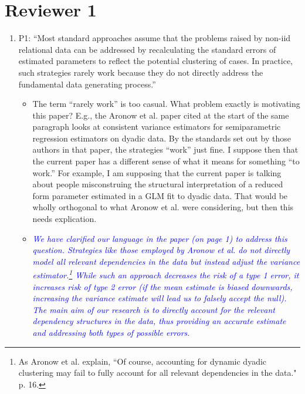 \section*{Reviewer 1}

\begin{enumerate}
	\item P1: ``Most standard approaches assume that the problems raised by non-iid relational data can be addressed by recalculating the standard errors of estimated parameters to reflect the potential clustering of cases. In practice, such strategies rarely work because they do not directly address the fundamental data generating process.''
	\begin{itemize}
		\item The term “rarely work” is too casual.  What problem exactly is motivating this paper?  E.g., the Aronow et al. paper cited at the start of the same paragraph looks at consistent variance estimators for semiparametric regression estimators on dyadic data. By the standards set out by those authors in that paper, the strategies “work” just fine.  I suppose then that the current paper has a different sense of what it means for something “to work.” For example, I am supposing that the current paper is talking about people misconstruing the structural interpretation of a reduced form parameter estimated in a GLM fit to dyadic data.  That would be wholly orthogonal to what Aronow et al. were considering, but then this needs explication.
	\end{itemize}
	\begin{itemize}
		\item  \emph{ \textcolor{blue}{
		We have clarified our language in the paper (on page 1) to address this question.  Strategies like those employed by Aronow et al. do not directly model all relevant dependencies in the data but instead adjust the variance estimator.\footnote{As Aronow et al. explain, “Of course, accounting for dynamic dyadic clustering may fail to fully account for all relevant dependencies in the data." p. 16.}   While such an approach decreases the risk of a type 1 error, it increases risk of type 2 error (if the mean estimate is biased downwards, increasing the variance estimate will lead us to falsely accept the null). The main aim of our research is to directly account for the relevant dependency structures in the data, thus providing an accurate estimate and addressing both types of possible errors.
		}}

\end{itemize}
\end{enumerate}
